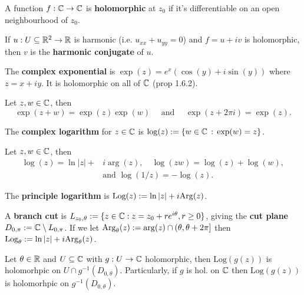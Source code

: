 \begin{multicols}{2}
\begin{definition}
A function $f:\mathbb{C}\to\mathbb{C}$ is \textbf{holomorphic} at $z_0$ if it's differentiable on an open neighbourhood of $z_0$.
\end{definition}

\begin{definition}
If $u:U\subseteq\mathbb{R}^2\to\mathbb{R}$ is harmonic (i.e. $u_{xx}+u_{yy}=0$) and $f=u+iv$ is holomorphic, then $v$ is the \textbf{harmonic conjugate} of $u$.
\end{definition}

\begin{definition}
The \textbf{complex exponential} is $\exp(z) = e^x(\cos(y)+i\sin(y))$ where $z=x+iy$. It is holomorphic on all of $\mathbb{C}$ (prop 1.6.2).
\end{definition}

\begin{theorem}
Let $z,w\in\mathbb{C}$, then
    \[
    \exp(z+w)=\exp(z)\exp(w)
    \quad\text{ and }\quad
    \exp(z+2\pi i)=\exp(z).
    \]
\end{theorem}

\begin{definition}
The \textbf{complex logarithm} for $z\in\mathbb{C}$ is $\log(z):=\{w\in\mathbb{C}\,:\,\exp(w)=z\}$.
\end{definition}

\begin{theorem}[1.7.3]
Let $z,w\in\mathbb{C}$, then
    \begin{align*}
    \log(z)=\ln|z| + &i\arg(z),
    \quad
    \log(zw)=\log(z)+\log(w),
    \\
    &\text{and } \log(1/z)=-\log(z).
    \end{align*}
\end{theorem}

\begin{definition}
The \textbf{principle logarithm} is $\text{Log}(z):= \ln|z| + i\mathrm{Arg}(z)$. 
\end{definition}

\begin{definition}
A \textbf{branch cut} is $L_{z_0,\theta} := \{z\in\mathbb{C}:z=z_0+re^{i\theta},r\geq0\}$, giving the \textbf{cut plane} $D_{0,\pi}:=\mathbb{C}\setminus L_{0,\pi}$. If we let $\mathrm{Arg}_\theta(z):=\arg(z)\cap(\theta,\theta+2\pi]$ then $\text{Log}_\theta:=\ln|z| + i\mathrm{Arg}_\theta(z)$.
\end{definition}

\begin{theorem}[1.7.10]
Let $\theta\in\mathbb{R}$ and $U\subseteq\mathbb{C}$ with $g:U\to\mathbb{C}$ holomorphic, then $\text{Log}(g(z))$ is holomorhpic on $U\cap g^{-1}(D_{0,\theta})$. Particularly, if $g$ is hol. on $\mathbb{C}$ then $\text{Log}(g(z))$ is holomorhpic on $g^{-1}(D_{0,\theta})$.
\end{theorem}



\end{multicols}